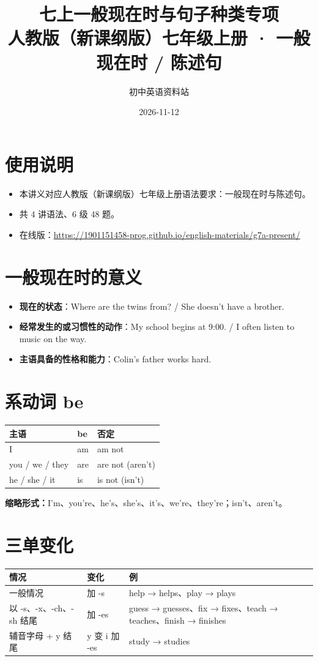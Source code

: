 \documentclass[11pt,a4paper]{ctexart}
\title{\textbf{七上一般现在时与句子种类专项}\\[4pt]
\large 人教版（新课纲版）七年级上册 · 一般现在时 / 陈述句}
\author{初中英语资料站}
\date{2026-11-12}
\begin{document}
\maketitle

\section*{使用说明}
\begin{itemize}[leftmargin=1.4em]
\item 本讲义对应人教版（新课纲版）七年级上册语法要求：一般现在时与陈述句。
\item 共 4 讲语法、6 级 48 题。
\item 在线版：\url{https://1901151458-prog.github.io/english-materials/g7a-present/}
\end{itemize}

\section{一般现在时的意义}
\begin{itemize}[leftmargin=1.4em]
\item \textbf{现在的状态}：Where are the twins from? / She doesn't have a brother.
\item \textbf{经常发生的或习惯性的动作}：My school begins at 9:00. / I often listen to music on the way.
\item \textbf{主语具备的性格和能力}：Colin's father works hard.
\end{itemize}

\section{系动词 be}
\begin{center}
\begin{tabular}{p{4.6cm}p{3.0cm}p{5.4cm}}
\hline
\textbf{主语} & \textbf{be} & \textbf{否定}\\
\hline
I & am & am not\\
you / we / they & are & are not (aren't)\\
he / she / it & is & is not (isn't)\\
\hline
\end{tabular}
\end{center}
\textbf{缩略形式：}I'm、you're、he's、she's、it's、we're、they're；isn't、aren't。

\section{三单变化}
\begin{center}
\begin{tabular}{p{5.0cm}p{3.0cm}p{5.0cm}}
\hline
\textbf{情况} & \textbf{变化} & \textbf{例}\\
\hline
一般情况 & 加 -s & help → helps、play → plays\\
以 -s、-x、-ch、-sh 结尾 & 加 -es & guess → guesses、fix → fixes、teach → teaches、finish → finishes\\
辅音字母 + y 结尾 & y 变 i 加 -es & study → studies\\
\hline
\end{tabular}
\end{center}
\end{document}
